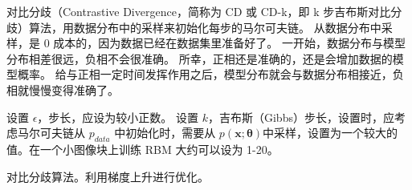 对比分歧（Contrastive Divergence，简称为 CD 或 CD-k，即 k 步吉布斯对比分歧）算法，用数据分布中的采样来初始化每步的马尔可夫链。
从数据分布中采样，是 0 成本的，因为数据已经在数据集里准备好了。
一开始，数据分布与模型分布相差很远，负相不会很准确。
所幸，正相还是准确的，还是会增加数据的模型概率。
给与正相一定时间发挥作用之后，模型分布就会与数据分布相接近，负相就慢慢变得准确了。

\begin{algorithm}
\DontPrintSemicolon
设置 \(\epsilon\)，步长，应设为较小正数。\;
设置 \(k\)，吉布斯（Gibbs）步长，设置时，应考虑马尔可夫链从 \(p_{data}\) 中初始化时，需要从 \(p(\bm{x};\bm{\theta})\)中采样，设置为一个较大的值。在一个小图像块上训练 RBM 大约可以设为 1-20。\;
\caption{对比分歧算法。利用梯度上升进行优化。\label{alg:18.2}}
\end{algorithm}

